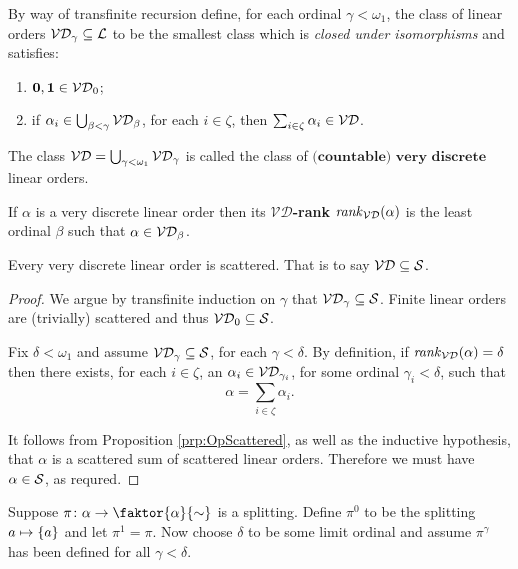 \begin{dfn}
		By way of transfinite recursion define, for each ordinal
		$\gamma<\omega_1$, the class of linear orders
		$\mathcal{VD}_{\gamma}\subseteq\mathcal{L}$ to be the smallest class which is
		\textit{closed under isomorphisms} and satisfies:
        \begin{enumerate}
            \item   $\mathbf{0},\mathbf{1}\in\mathcal{VD}_0$;
			\item   if $\alpha_i\in\bigcup_{\beta<\gamma}\mathcal{VD}_{\beta}$, for each
				$i\in \zeta$, then $\sum_{i\in\zeta}\alpha_i\in\mathcal{VD}$.
        \end{enumerate}
		The class $\mathcal{VD}=\bigcup_{\gamma<\omega_1}\mathcal{VD}_\gamma$ is called the class
		of $\textbf{(countable) very discrete}$ linear orders.
\end{dfn}

\begin{dfn}[$\VD$-rank]
		If $\alpha$ is a very discrete linear order then its
		$\bm{\mathcal{VD}}$\textbf{-rank} $\mathit{rank}_\mathcal{VD}(\alpha)$ is the least ordinal
		$\beta$ such that $\alpha\in\mathcal{VD}_{\beta}$.
\end{dfn}

\begin{lem}\label{prp:vdsct}
	Every very discrete linear order is scattered.  That is to say
	$\mathcal{VD}\subseteq\mathcal{S}$.
\end{lem}
\begin{proof}
	We argue by transfinite induction on $\gamma$ that
	$\mathcal{VD}_\gamma\subseteq\mathcal{S}$.  Finite linear orders are (trivially)
	scattered and thus $\mathcal{VD}_0\subseteq\mathcal{S}$.

	Fix $\delta<\omega_1$ and assume $\mathcal{VD}_\gamma\subseteq\mathcal{S}$, for each
	$\gamma<\delta$.  By definition, if $\mathit{rank}_\mathcal{VD}(\alpha)=\delta$ then there
	exists, for each $i\in\zeta$, an $\alpha_i\in\mathcal{VD}_{\gamma_i}$, for some
	ordinal
	$\gamma_i<\delta$, such that
	\begin{equation}
		\alpha=\sum_{i\in\zeta}\alpha_i.
	\end{equation}

	It follows from Proposition \ref{prp:OpScattered}, as well as the
	inductive hypothesis, that $\alpha$ is a scattered sum of scattered linear
	orders.  Therefore we must have $\alpha\in\mathcal{S}$, as requred.
\end{proof}

Suppose $\pi\colon\alpha\to\faktor{\alpha}{\sim}$ is a splitting. Define $\pi^0$
to be the splitting $a\mapsto\left\lbrace a\right\rbrace$ and let $\pi^1=\pi$. Now choose $\delta$
to be some limit ordinal and assume $\pi^\gamma$ has been defined for all
$\gamma<\delta$.

